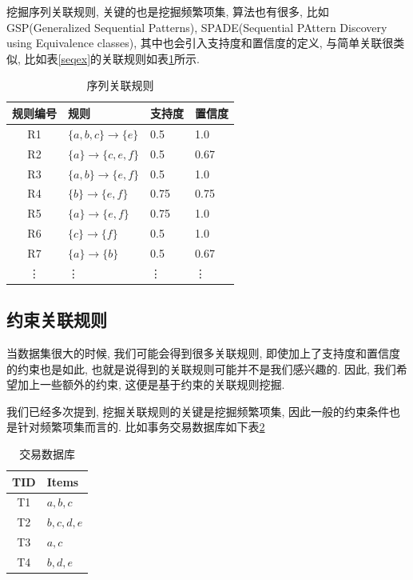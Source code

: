 \documentclass[a4paper,UTF8]{ctexart}
\theoremstyle{plain} \newtheorem{theorem}{定理}[section]
\theoremstyle{plain} \newtheorem{definition}{定义}[section]
\theoremstyle{plain} \newtheorem{lemma}{引理}[section]
\theoremstyle{plain} \newtheorem{proposition}{命题}[section]
\theoremstyle{plain} \newtheorem{example}{例}[section]
\theoremstyle{plain} \newtheorem{remark}{注}[section]
\theoremstyle{plain} \newtheorem{corollary}{推论}[section]
\begin{document}
挖掘序列关联规则, 关键的也是挖掘频繁项集, 算法也有很多, 比如 GSP(Generalized Sequential Patterns), SPADE(Sequential PAttern Discovery using Equivalence classes), 其中也会引入支持度和置信度的定义, 与简单关联很类似, 比如表\ref{seqex}的关联规则如表\ref{seqrule}所示.
\begin{table}[!htb]
\centering
\caption{序列关联规则}
\label{seqrule}
\begin{tabular}{clll}
	\hline
    \textbf{规则编号} & \textbf{规则} & \textbf{支持度} & \textbf{置信度} \\
    \hline
    R1  & $\{a, b, c\} \rightarrow \{e\}$  & 0.5  &  1.0 \\
    \hline
    R2  & $\{a\} \rightarrow \{c,e,f\}$  & 0.5  & 0.67  \\
    \hline
    R3  & $\{a,b\} \rightarrow \{e,f\}$  & 0.5  & 1.0  \\
    \hline
    R4  & $\{b\} \rightarrow \{e,f\}$  & 0.75  & 0.75 \\ 
    \hline
    R5  & $\{a\} \rightarrow \{e,f\}$  & 0.75  & 1.0 \\ 
    \hline
    R6  & $\{c\} \rightarrow \{f\}$  & 0.5  & 1.0 \\ 
    \hline 
    R7  & $\{a\} \rightarrow \{b\}$  & 0.5  & 0.67 \\ 
    \hline
    \vdots  &  \vdots  &  \vdots  &  \vdots \\
	\hline
\end{tabular}
\end{table}


\subsection{约束关联规则}
当数据集很大的时候, 我们可能会得到很多关联规则, 即使加上了支持度和置信度的约束也是如此, 也就是说得到的关联规则可能并不是我们感兴趣的. 因此, 我们希望加上一些额外的约束, 这便是基于约束的关联规则挖掘. 

我们已经多次提到, 挖掘关联规则的关键是挖掘频繁项集, 因此一般的约束条件也是针对频繁项集而言的. 比如事务交易数据库如下表\ref{constrain}
\begin{table}[!htb]
\centering
\caption{交易数据库}
\label{constrain}
\begin{tabular}{c|l}
	\hline
    \textbf{TID} & \textbf{Items}  \\
    \hline
    T1 & $a, b, c$ \\
    \hline
    T2 & $b, c, d, e$ \\
    \hline
    T3 & $a, c$ \\
    \hline
    T4 & $b, d, e$ \\
	\hline
\end{tabular}
\end{table}
\end{document}
